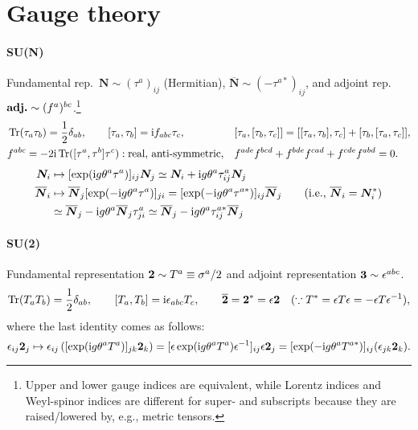 \documentclass[CheatSheet]{subfiles}
\begin{document}
\summarystyle

\section{Gauge theory}
\paragraph{SU(N)}Fundamental rep.~$\boldsymbol N\sim (\tau^{a})_{ij}$ (Hermitian), $\overline{\boldsymbol N}\sim(-\tau^{a*})_{ij}$, and adjoint rep.~$\text{\textbf{adj.}}\sim (f^a)^{bc}$.\footnote{Upper and lower gauge indices are equivalent, while Lorentz indices and Weyl-spinor indices are different for super- and subscripts because they are raised/lowered by, e.g., metric tensors.}
\begin{align*}
 &\operatorname{\mathrm{Tr}}(\tau_a\tau_b)=\frac12\delta_{ab},\qquad
 [\tau_a,\tau_b]=\mathrm{i} f_{abc}\tau_c,&
 &[\tau_a,[\tau_b,\tau_c]] = [[\tau_a,\tau_b],\tau_c] + [\tau_b,[\tau_a,\tau_c]],\\
 &f^{abc}=-2\mathrm{i}\operatorname{\mathrm{Tr}}([\tau^a,\tau^b]\tau^c): \text{real, anti-symmetric},&
 &f^{ade}f^{bcd} + f^{bde}f^{cad} + f^{cde}f^{abd} = 0.
\end{align*}
\begin{align}
 \boldsymbol{N}_i
&\mapsto [\exp(\mathrm{i} g\theta^a \tau^a)]_{ij}\boldsymbol{N}_j
\simeq  \boldsymbol{N}_i + \mathrm{i} g\theta^a \tau^a_{ij}\boldsymbol{N}_j\\\notag
 \overline{\boldsymbol{N}}_i
&\mapsto
\overline{\boldsymbol{N}}_j [\exp(-\mathrm{i} g\theta^a \tau^a)]_{ji}
= [\exp(-\mathrm{i} g\theta^a \tau^{a*})]_{ij} \overline{\boldsymbol{N}}_j \qquad\text{(i.e., $\overline{\boldsymbol{N}}_i=\boldsymbol N_i^*$)}\\
&\simeq\overline{\boldsymbol{N}}_j -\mathrm{i} g\theta^a \overline{\boldsymbol{N}}_j\tau^a_{ji}
\simeq \overline{\boldsymbol{N}}_j -\mathrm{i} g\theta^a \tau^{a*}_{ij} \overline{\boldsymbol{N}}_j\end{align}

\paragraph{SU(2)} Fundamental representation $\bm 2\sim T^a \equiv \sigma^a/2$ and adjoint representation $\bm 3\sim \epsilon^{abc}$.
\begin{equation*}
 \operatorname{\mathrm{Tr}}(T_aT_b)=\frac12\delta_{ab},\qquad
 [T_a,T_b]=\mathrm{i} \epsilon_{abc}T_c,\qquad
 \overline{\bm 2} = \bm 2^* = \epsilon\bm 2\quad (\because T^*=\epsilon T \epsilon=-\epsilon T\epsilon^{-1}),
\end{equation*}
where the last identity comes as follows:
\begin{equation}
\epsilon_{ij} \bm 2_j
\mapsto
\epsilon_{ij}\left(
[\exp(\mathrm{i} g\theta^a T^a)]_{jk}\bm 2_k
\right)
= [\epsilon\exp(\mathrm{i} g\theta^a T^a)\epsilon^{-1}]_{ij}\epsilon\bm 2_j
= [\exp(-\mathrm{i} g\theta^a T^{a*})]_{ij}(\epsilon_{jk}\bm 2_k).
\end{equation}
\end{document}
